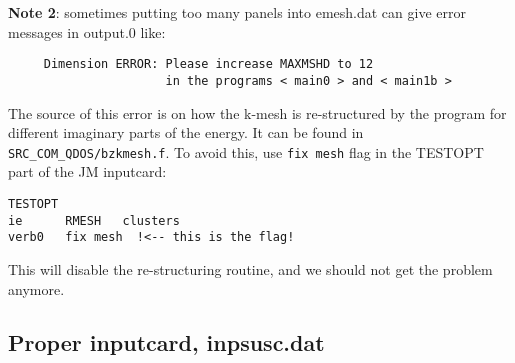 \documentclass[a4paper,10pt,fullpage]{report}
\begin{document}
\begin{itemize}
\textbf{Note 2}: sometimes putting too many panels into emesh.dat can give error messages 
in output.0 like:
\begin{verbatim}
     Dimension ERROR: Please increase MAXMSHD to 12
                      in the programs < main0 > and < main1b >

\end{verbatim}
The source of this error is on how the k-mesh is re-structured by 
the program for different imaginary parts of the energy. It can be found in
\verb|SRC_COM_QDOS/bzkmesh.f|. To avoid this, use
\verb|fix mesh| flag in the TESTOPT part of the JM inputcard:
\begin{verbatim}
TESTOPT
ie      RMESH   clusters
verb0   fix mesh  !<-- this is the flag!
\end{verbatim}
This will disable the re-structuring routine, and we should not get the problem anymore.

\end{itemize}




\subsection{Proper inputcard, inpsusc.dat}
\end{document}
